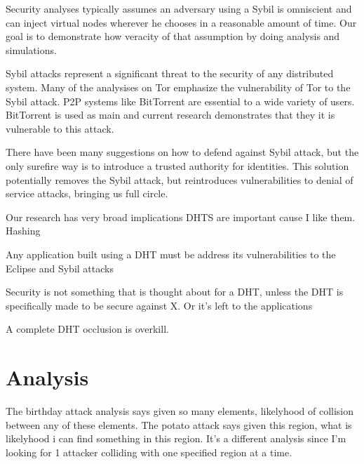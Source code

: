 \documentclass[10pt,a4paper]{article}
\begin{document}
Security analyses typically assumes an adversary using a Sybil is omniscient and can inject virtual nodes wherever he chooses in a reasonable amount of time. 
Our goal is to demonstrate how veracity of that assumption by doing analysis and simulations.

Sybil attacks represent a significant threat to the security of any distributed system.
Many of the analysises on Tor emphasize the vulnerability of Tor to the Sybil attack.
P2P systems like BitTorrent are essential to a wide variety of users.
BitTorrent is used as main
 and current research demonstrates that they it is vulnerable to this attack.


There have been many suggestions on how to defend against Sybil attack, but the only surefire way is to introduce a trusted authority for identities.
This solution potentially removes the Sybil attack, but reintroduces vulnerabilities to denial of service attacks, bringing us full circle.




Our research has very broad implications 
DHTS are important cause I like them.
Hashing 

Any application built using a DHT must be address its vulnerabilities to the Eclipse and Sybil attacks

Security is not something that is thought about for a DHT, unless the 
DHT is specifically made to be secure against X.  
Or it's left to the applications


A complete DHT occlusion is overkill.



\section{Analysis}

\cite{bellare2004hash}

The birthday attack analysis says given so many elements, likelyhood of collision between any of these elements.
The potato attack says given this region, what is likelyhood i can find something in this region.  
It's a different analysis since I'm looking for 1 attacker colliding with one specified region at a time.
\end{document}
